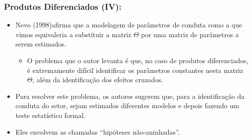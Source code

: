 \documentclass{beamer}
\begin{document}
\begin{frame}\frametitle{Produtos Diferenciados (IV):}

\begin{itemize}
\item Nevo (1998)afirma que a modelagem de parâmetros de conduta como a
que vimos equivaleria a substituir a matriz $\Theta$ por uma matriz
de parâmetros a serem estimados. 

\begin{itemize}
\item O problema que o autor levanta é que, no caso de produtos diferenciados,
é extremamente difícil identificar os parâmetros constantes nesta
matriz $\Theta$, além da identificação dos efeitos cruzados.
\end{itemize}
\item Para resolver este problema, os autores sugerem que, para a identificação
da conduta do setor, sejam estimados diferentes modelos e depois fazendo
um teste estatístico formal. 
\item Eles envolvem as chamadas ``hipóteses não-aninhadas''. 
\end{itemize}
\end{frame}


\begin{frame}[allowframebreaks]



\end{frame}

\end{document}
